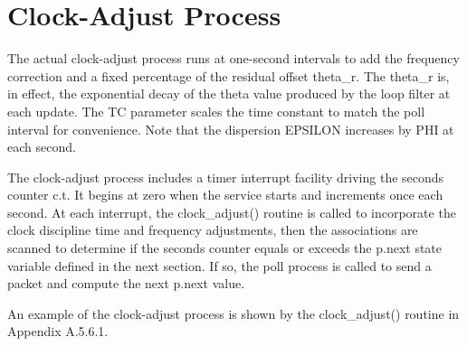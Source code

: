 \chapter{Clock-Adjust Process}

The actual clock-adjust process runs at one-second intervals to add
the frequency correction and a fixed percentage of the residual
offset theta\_r.  The theta\_r is, in effect, the exponential decay of
the theta value produced by the loop filter at each update.  The TC
parameter scales the time constant to match the poll interval for
convenience.  Note that the dispersion EPSILON increases by PHI at
each second.

The clock-adjust process includes a timer interrupt facility driving
the seconds counter c.t.  It begins at zero when the service starts
and increments once each second.  At each interrupt, the
clock\_adjust() routine is called to incorporate the clock discipline
time and frequency adjustments, then the associations are scanned to
determine if the seconds counter equals or exceeds the p.next state
variable defined in the next section.  If so, the poll process is
called to send a packet and compute the next p.next value.

An example of the clock-adjust process is shown by the clock\_adjust()
routine in Appendix A.5.6.1.
